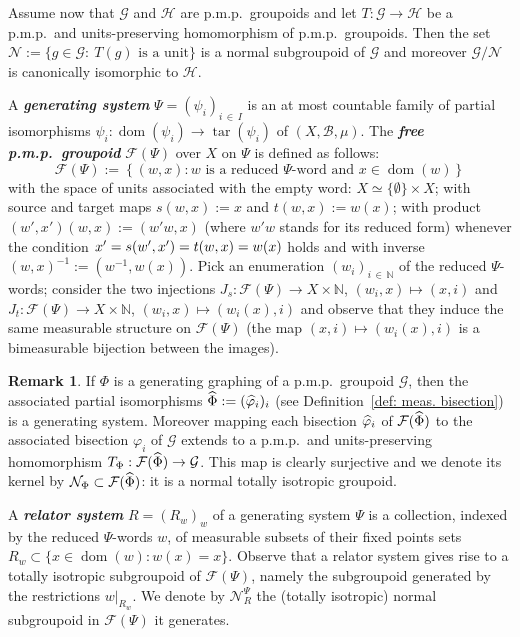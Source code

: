 \documentclass[10pt]{amsart}
\theoremstyle{definition}
\newtheorem{rema}[cdrthm]{Remark}
\newcommand{\defin}[1]{\textbf{\emph{#1}}}
\newcommand{\Nmath}{\mathbb{N}}
\newcommand{\cn}{\mathcal{N}}
\newcommand{\ch}{\mathcal{H}}
\newcommand{\cg}{\mathcal{G}}
\newcommand{\cf}{\mathcal{F}}
\newcommand{\rb}{\mathscr{B}}
\DeclareMathOperator{\dom}{dom}
\DeclareMathOperator{\tar}{tar}
\newcommand{\ph}{\varphi}
\newcommand{\pmp}{p.m.p.\ }
\let\oldhat\hat
\renewcommand*{\hat}[1]{\mathchoice{\widehat{#1}}{\widehat{#1}}{\oldhat{#1}}{\oldhat{#1}}}
\begin{document}
Assume now that $\cg$ and $\ch$ are \pmp groupoids and let $T:\cg\rightarrow \ch$ be a \pmp and units-preserving homomorphism of \pmp groupoids. Then the set $\cn:=\{g\in \cg:\ T(g)\text{ is a unit}\}$ is a normal subgroupoid of $\cg$ and moreover $\cg/\cn$ is canonically isomorphic to $\ch$.



A \defin{generating system} $\Psi=(\psi_i)_{i\,\in\,I}$ is an at most countable family of partial isomorphisms $\psi_i:\dom(\psi_i)\to \tar(\psi_i)$ of $(X,\rb, \mu)$. The \defin{free \pmp groupoid} $\cf(\Psi)$ over $X$ on $\Psi$ is defined as follows:
\[
\cf(\Psi):=\left\{(w,x): w \text{ is a reduced $\Psi$-word and } x\in \dom(w) \right\}
\]
with the space of units associated with the empty word: $X \simeq \{\emptyset\} \times X$; with source and target maps $s(w,x):=x$ and $t(w,x):=w(x)$; with product $(w',x')(w,x):=(w'w,x)$ (where $w'w$ stands for its reduced form) whenever the condition $x'=s(w',x')\linebreak=t(w,x)=w(x)$ holds and with inverse $(w,x)^{-1}:=(w^{-1}, w(x))$. Pick an enumeration $(w_i)_{i\,\in\,\Nmath}$ of the reduced $\Psi$-words; consider the two injections $J_s:\cf(\Psi)\to X\times \Nmath$, $(w_i, x)\mapsto (x,i)$ and $J_t:\cf(\Psi)\to X\times \Nmath$, $(w_i, x)\mapsto (w_i(x),i)$ and observe that they induce the same measurable structure on $\cf(\Psi)$ (the map $(x,i)\mapsto (w_i(x),i)$ is a bimeasurable bijection between the images).

\begin{rema}
If $\Phi$ is a generating graphing of a \pmp groupoid $\cg$, then the associated partial isomorphisms $\hat \Phi:=(\hat \ph_i)_i$ (see Definition~\ref{def: meas. bisection}) is a generating system. Moreover mapping each bisection $\hat \ph_i$ of $\cf(\hat\Phi)$ to the associated bisection $\ph_i$ of $\cg$ extends to a \pmp and units-preserving homomorphism $T_\Phi:\cf(\hat\Phi)\rightarrow \cg$. This map is clearly surjective and we denote its kernel by $\cn_\Phi\subset \cf(\hat\Phi)$: it is a normal totally isotropic groupoid.
\end{rema}

A \defin{relator system} $R=(R_w)_w$ of a generating system $\Psi$ is a collection, indexed by the reduced $\Psi$-words $w$, of measurable subsets of their fixed points sets $R_w\subset \{x\in \dom(w): w(x)=x\}$. Observe that a relator system gives rise to a totally isotropic subgroupoid of $\cf(\Psi)$, namely the subgroupoid generated by the restrictions $w|_{R_w}$. We denote by $\cn_R^{\Psi}$ the (totally isotropic) normal subgroupoid in $\cf(\Psi)$ it generates.
\end{document}
